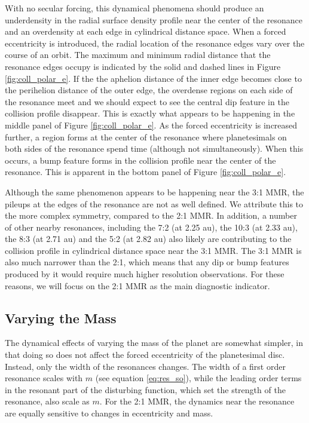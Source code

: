 With no secular forcing, this dynamical phenomena should produce an underdensity in the radial surface density profile near the 
center of the resonance and an overdensity at each edge in cylindrical distance space. When a forced eccentricity is introduced, 
the radial location of the resonance edges vary over the course of an orbit. The maximum and minimum radial distance that the 
resonance edges occupy is indicated by the solid and dashed lines in Figure \ref{fig:coll_polar_e}. If the the aphelion distance of 
the inner edge becomes close to the perihelion distance of the outer edge, the overdense regions on each side of the resonance 
meet and we should expect to see the central dip feature in the collision profile disappear. This is exactly what appears to be 
happening in the middle panel of Figure \ref{fig:coll_polar_e}. As the forced eccentricity is increased further, a region forms at the 
center of the resonance where planetesimals on both sides of the resonance spend time (although not simultaneously). When 
this occurs, a bump feature forms in the collision profile near the center of the resonance. This is apparent in the bottom panel of 
Figure \ref{fig:coll_polar_e}.

Although the same phenomenon appears to be happening near the 3:1 MMR, the pileups at the edges of the resonance are not 
as well defined. We attribute this to the more complex symmetry, compared to the 2:1 MMR. In addition, a number of other 
nearby resonances, including the 7:2 (at 2.25 au), the 10:3 (at 2.33 au), the 8:3 (at 2.71 au) and the 5:2 (at 2.82 au) also likely 
are contributing to the collision profile in cylindrical distance space near the 3:1 MMR. The 3:1 MMR is also much narrower than 
the 2:1, which means that any dip or bump features produced by it would require much higher resolution observations. For these 
reasons, we will focus on the 2:1 MMR as the main diagnostic indicator.

\subsection{Varying the Mass}

The dynamical effects of varying the mass of the planet are somewhat simpler, in that doing so does not affect the forced 
eccentricity of the planetesimal disc. Instead, only the width of the resonances changes. The width of a first order resonance 
scales with $m$ (see equation \ref{eq:res_so}), while the leading order terms in the resonant part of the disturbing function, 
which set the strength of the resonance, also scale as $m$. For the 2:1 MMR, the dynamics near the resonance are equally 
sensitive to changes in eccentricity and mass.

